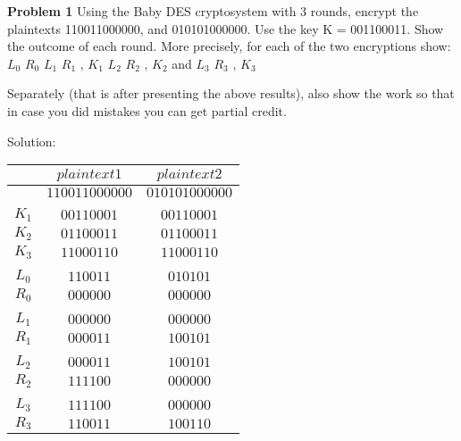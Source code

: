 \documentclass[12pt,letterpaper,final]{report}
\begin{document}

\vline


\noindent\textbf{Problem 1}
Using the Baby DES cryptosystem with 3 rounds, encrypt the plaintexts 110011000000, and 010101000000. Use the key K = 001100011. Show the outcome of each round. More precisely, for each of the two encryptions show: 
\newline\indent\indent\indent\indent $L_0$  $R_0$
\newline\indent\indent\indent\indent $L_1$  $R_1$ , $K_1$
\newline\indent\indent\indent\indent $L_2$  $R_2$ , $K_2$
\newline\indent\indent\indent\indent and
\newline\indent\indent\indent\indent $L_3$  $R_3$ , $K_3$

\bigskip Separately (that is after presenting the above results), also show the work so that in case you did mistakes you can get partial credit.
\bigskip

	Solution: 
\indent\begin{tabular}{|c|c|c|}
\hline
$ $ & $plaintext 1$ & $plaintext 2$ \\
\hline
$ $  & $110011000000$ & $010101000000$\\
$ $ & $ $ & $ $ \\
$K_1$ & $00110001$ & $00110001$ \\
$K_2$ & $01100011$ & $01100011$ \\
$K_3$ & $11000110$ & $11000110$ \\
$ $ & $ $ & $ $ \\
$L_0$ & $110011$ & $010101$ \\
$R_0$ & $000000$ & $000000$ \\
$ $ & $ $ & $ $ \\
$L_1$ & $000000$ & $000000$ \\
$R_1$ & $000011$ & $100101$ \\
$ $ & $ $ & $ $ \\
$L_2$ & $000011$ & $100101$ \\
$R_2$ & $111100$ & $000000$ \\
$ $ & $ $ & $ $ \\
$L_3$ & $111100$ & $000000$ \\
$R_3$ & $110011$ & $100110$ \\
\hline
\end{tabular}
\end{document}
